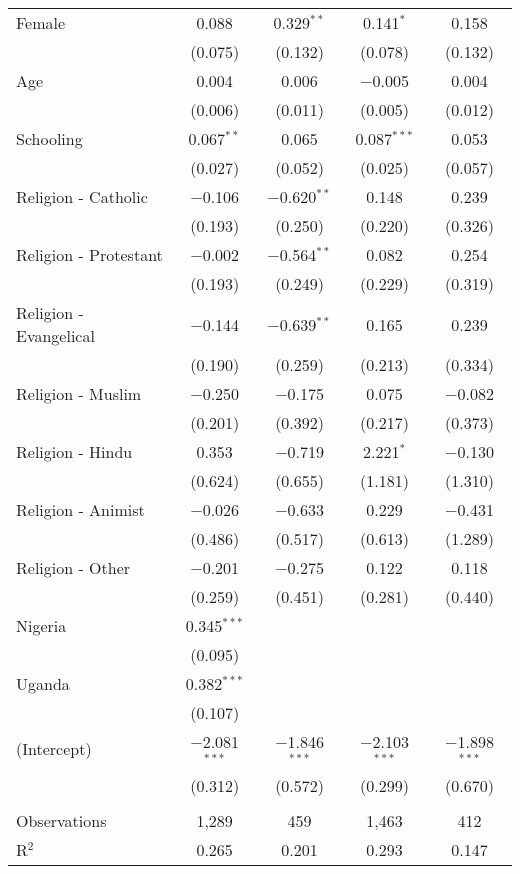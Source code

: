 \begin{table}[!htbp]
\begin{tabular}{@{\extracolsep{5pt}}lcccc}
  Female & 0.088 & 0.329$^{**}$ & 0.141$^{*}$ & 0.158 \\ 
  & (0.075) & (0.132) & (0.078) & (0.132) \\ 
  Age & 0.004 & 0.006 & $-$0.005 & 0.004 \\ 
  & (0.006) & (0.011) & (0.005) & (0.012) \\ 
  Schooling & 0.067$^{**}$ & 0.065 & 0.087$^{***}$ & 0.053 \\ 
  & (0.027) & (0.052) & (0.025) & (0.057) \\ 
  Religion - Catholic & $-$0.106 & $-$0.620$^{**}$ & 0.148 & 0.239 \\ 
  & (0.193) & (0.250) & (0.220) & (0.326) \\ 
  Religion - Protestant & $-$0.002 & $-$0.564$^{**}$ & 0.082 & 0.254 \\ 
  & (0.193) & (0.249) & (0.229) & (0.319) \\ 
  Religion - Evangelical & $-$0.144 & $-$0.639$^{**}$ & 0.165 & 0.239 \\ 
  & (0.190) & (0.259) & (0.213) & (0.334) \\ 
  Religion - Muslim & $-$0.250 & $-$0.175 & 0.075 & $-$0.082 \\ 
  & (0.201) & (0.392) & (0.217) & (0.373) \\ 
  Religion - Hindu & 0.353 & $-$0.719 & 2.221$^{*}$ & $-$0.130 \\ 
  & (0.624) & (0.655) & (1.181) & (1.310) \\ 
  Religion - Animist & $-$0.026 & $-$0.633 & 0.229 & $-$0.431 \\ 
  & (0.486) & (0.517) & (0.613) & (1.289) \\ 
  Religion - Other & $-$0.201 & $-$0.275 & 0.122 & 0.118 \\ 
  & (0.259) & (0.451) & (0.281) & (0.440) \\ 
  Nigeria & 0.345$^{***}$ &  &  &  \\ 
  & (0.095) &  &  &  \\ 
  Uganda & 0.382$^{***}$ &  &  &  \\ 
  & (0.107) &  &  &  \\ 
  (Intercept) & $-$2.081$^{***}$ & $-$1.846$^{***}$ & $-$2.103$^{***}$ & $-$1.898$^{***}$ \\ 
  & (0.312) & (0.572) & (0.299) & (0.670) \\ 
 \hline \\[-1.8ex] 
Observations & 1,289 & 459 & 1,463 & 412 \\ 
R$^{2}$ & 0.265 & 0.201 & 0.293 & 0.147 \\ 

\end{tabular}
\end{table}
